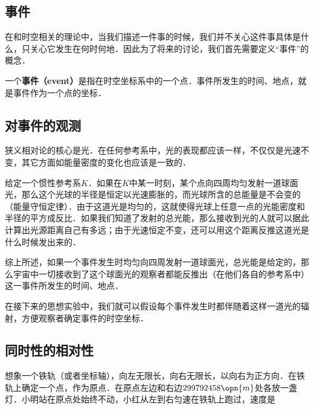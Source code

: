 

\subsection{事件}

在和时空相关的理论中，当我们描述一件事的时候，我们并不关心这件事具体是什么，只关心它发生在何时何地．因此为了将来的讨论，我们首先需要定义“事件”的概念．

一个\textbf{事件（event）}是指在时空坐标系中的一个点．事件所发生的时间、地点，就是事件作为一个点的坐标．

\subsection{对事件的观测}

狭义相对论的核心是光．在任何参考系中，光的表现都应该一样，不仅仅是光速不变，其它方面如能量密度的变化也应该是一致的．

给定一个惯性参考系$K$．如果在$K$中某一时刻，某个点向四周均匀发射一道球面光，那么这个光球的半径是恒定以光速膨胀的，而光球所含的总能量是不会变的（能量守恒定律）．由于这道光是均匀的，这就使得光球上任意一点的光能密度和半径的平方成反比．如果我们知道了发射的总光能，那么接收到光的人就可以据此计算出光源距离自己有多远；由于光速恒定不变，还可以用这个距离反推这道光是什么时候发出来的．

综上所述，如果一个事件发生时均匀向四周发射一道球面光，总光能是给定的，那么宇宙中一切接收到了这个球面光的观察者都能反推出（在他们各自的参考系中）这一事件所发生的时间、地点．

在接下来的思想实验中，我们就可以假设每个事件发生时都伴随着这样一道光的辐射，方便观察者确定事件的时空坐标．

\subsection{同时性的相对性}

想象一个铁轨（或者坐标轴），向左无限长，向右无限长，以向右为正方向．在铁轨上确定一个点，作为原点．在原点左边和右边$299792458\opn{m}$处各放一盏灯．小明站在原点处始终不动，小红从左到右匀速在铁轨上跑过，速度是$$

